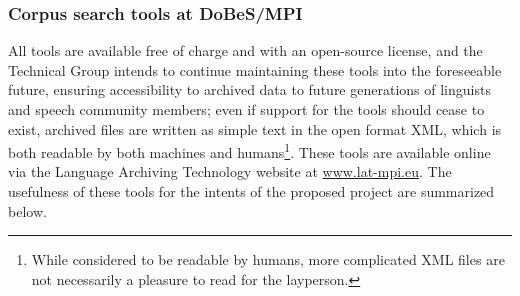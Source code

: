 \documentclass[a4paper,12pt]{article}
\begin{document}
\subsubsection{Corpus search tools at DoBeS/MPI}\label{dobesTools}
All tools are available free of charge and with an open-source license, and the Technical Group intends to continue maintaining these tools into the foreseeable future, ensuring accessibility to archived data to future generations of linguists and speech community members; even if support for the tools should cease to exist, archived files are written as simple text in the open format XML, which is both readable by both machines and humans\footnote{While considered to be readable by humans, more complicated XML files are not necessarily a pleasure to read for the layperson.}. These tools are available online via the Language Archiving Technology website at \url{www.lat-mpi.eu}. The usefulness of these tools for the intents of the proposed project are summarized below.
\end{document}
